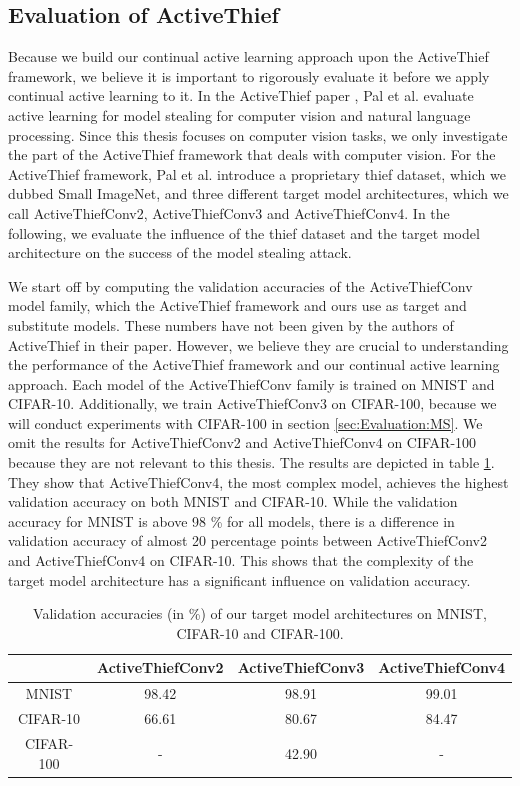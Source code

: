 \subsection{Evaluation of ActiveThief}
\label{sec:Appendix:MS:ActiveThief}
Because we build our continual active learning approach upon the ActiveThief framework, we believe it is important to rigorously evaluate it before we apply continual
active learning to it. In the ActiveThief paper \cite{pal2020activethief}, Pal et al. evaluate active learning for model stealing for computer vision and natural language
processing. Since this thesis focuses on computer vision tasks, we only investigate the part of the ActiveThief framework that deals with computer vision. For the ActiveThief
framework, Pal et al. introduce a proprietary thief dataset, which we dubbed Small ImageNet, and three different target model architectures, which we call ActiveThiefConv2,
ActiveThiefConv3 and ActiveThiefConv4. In the following, we evaluate the influence of the thief dataset and the target model architecture on
the success of the model stealing attack. \par
We start off by computing the validation accuracies of the ActiveThiefConv model family, which the ActiveThief framework and ours use as target and substitute models. 
These numbers have not been given by the authors of ActiveThief in their paper. However, we believe they are crucial to understanding the performance of the ActiveThief framework
and our continual active learning approach. Each model of the ActiveThiefConv family is trained on MNIST and CIFAR-10. Additionally, we train ActiveThiefConv3 on CIFAR-100,
because we will conduct experiments with CIFAR-100 in section \ref{sec:Evaluation:MS}. We omit the results for ActiveThiefConv2 and ActiveThiefConv4 on CIFAR-100
because they are not relevant to this thesis. The results are depicted in table \ref{fig:TargetModelAccuracies}. They show that ActiveThiefConv4, the most complex model,
achieves the highest validation accuracy on both MNIST and CIFAR-10. While the validation accuracy for MNIST is above 98 \% for all models, there is a difference in validation
accuracy of almost 20 percentage points between ActiveThiefConv2 and ActiveThiefConv4 on CIFAR-10. This shows that the complexity of the target model architecture has a
significant influence on validation accuracy. \par

\begin{table}[h]
    \centering
    \begin{tabular}{c| c c c} 
        & ActiveThiefConv2 & ActiveThiefConv3 & ActiveThiefConv4 \\ 
        \hline 
        MNIST & 98.42 & 98.91 & 99.01 \\
        CIFAR-10 & 66.61 & 80.67 & 84.47 \\
        CIFAR-100 & - & 42.90 & - \\
    \end{tabular}
    \caption{Validation accuracies (in \%) of our target model architectures on MNIST, CIFAR-10 and CIFAR-100.}
    \label{fig:TargetModelAccuracies}
\end{table}

